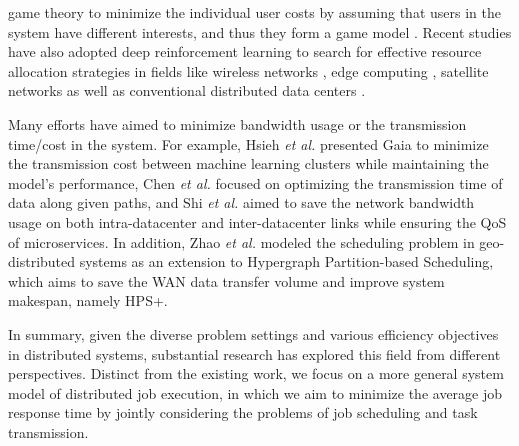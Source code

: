game theory to minimize the individual user costs by assuming that users in the system have different interests, and thus they form a game model \cite{chen2014decentralized, hogade2022energy}. Recent studies have also adopted deep reinforcement learning to search for effective resource allocation strategies in fields like wireless networks \cite{wang2021incorporating}, edge computing \cite{li2022drl, mohajer2024dynamic}, satellite networks \cite{liao2020distributed, li2022multi} as well as conventional distributed data centers \cite{wei2022multi}. %

Many efforts have aimed to minimize bandwidth usage or the transmission time/cost in the system. For example, Hsieh \textit{et al.} \cite{hsieh2017gaia} presented Gaia to minimize the transmission cost between machine learning clusters while maintaining the model's performance, Chen \textit{et al.} \cite{chen2021optimizing} focused on optimizing the transmission time of data along given paths, and Shi \textit{et al.} \cite{shi2024adaptive} aimed to save the network bandwidth usage on both intra-datacenter and inter-datacenter links while ensuring the QoS of microservices. In addition, Zhao \textit{et al.} \cite{zhao2019optimizing} modeled the scheduling problem in geo-distributed systems as an extension to Hypergraph Partition-based Scheduling, which aims to save the WAN data transfer volume and improve system makespan, namely HPS+. 

In summary, given the diverse problem settings and various efficiency objectives in distributed systems, substantial research has explored this field from different perspectives. Distinct from the existing work, we focus on a more general system model of distributed job execution, in which we aim to minimize the average job response time by jointly considering the problems of job scheduling and task transmission.



